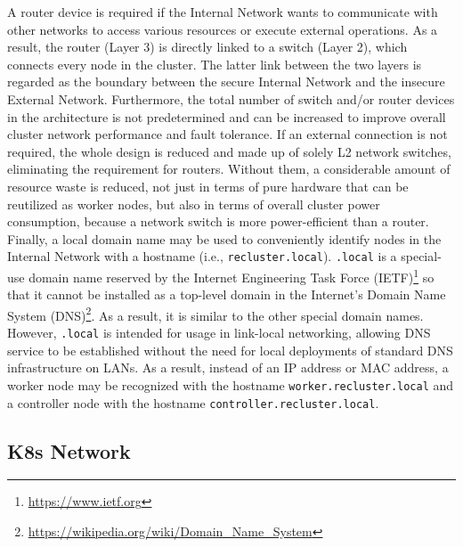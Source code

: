 A router device is required if the Internal Network wants to communicate with
other networks to access various resources or execute external operations. As a result,
the router (Layer 3) is directly linked to a switch (Layer 2), which connects every
node in the cluster. The latter link between the two layers is regarded as the
boundary between the secure Internal Network and the insecure External Network. Furthermore,
the total number of switch and/or router devices in the architecture is not
predetermined and can be increased to improve overall cluster network
performance and fault tolerance. If an external connection is not required, the
whole design is reduced and made up of solely L2 network switches, eliminating the
requirement for routers. Without them, a considerable amount of resource waste is
reduced, not just in terms of pure hardware that can be reutilized as worker
nodes, but also in terms of overall cluster power consumption, because a network
switch is more power-efficient than a router\cite{switch_vs_router_power_consumption}.
\\ %
Finally, a local domain name may be used to conveniently identify nodes in the
Internal Network with a hostname (i.e., \texttt{recluster.local}). \texttt{.local}
is a special-use domain name reserved by the Internet Engineering Task Force (IETF)\footnote{\url{https://www.ietf.org}}
so that it cannot be installed as a top-level domain in the Internet's Domain
Name System (DNS)\footnote{\url{https://wikipedia.org/wiki/Domain_Name_System}}.
As a result, it is similar to the other special domain names. However, \texttt{.local}
is intended for usage in link-local networking, allowing DNS service to be established
without the need for local deployments of standard DNS infrastructure on LANs\cite{local_domain_name}\cite{rfc_2606}.
As a result, instead of an IP address or MAC address, a worker node may be
recognized with the hostname \texttt{worker.recluster.local} and a controller node
with the hostname \texttt{controller.recluster.local}.

\subsection{K8s Network}
\label{subsec:architecture_network_k8s_network}

